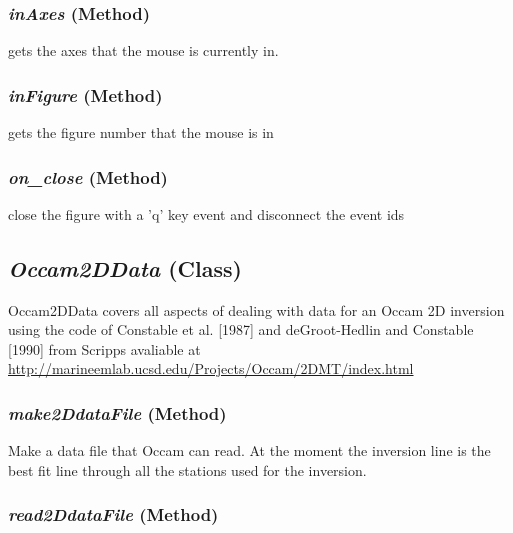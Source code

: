\subsubsection{\textit{inAxes} (Method)}
\label{sssec:.modeling.occamtools.OccamPointPicker.inAxes}

gets the axes that the mouse is currently in.

\subsubsection{\textit{inFigure} (Method)}
\label{sssec:.modeling.occamtools.OccamPointPicker.inFigure}

gets the figure number that the mouse is in

\subsubsection{\textit{on\_close} (Method)}
\label{sssec:.modeling.occamtools.OccamPointPicker.on_close}

close the figure with a 'q' key event and disconnect the event ids
        

\subsection{\textit{Occam2DData} (Class)}
\label{ssec:.modeling.occamtools.Occam2DData}

Occam2DData covers all aspects of dealing with data for an Occam 2D
    inversion using the code of Constable et al. [1987] and deGroot-Hedlin and 
    Constable [1990] from Scripps avaliable at \url{    http://marineemlab.ucsd.edu/Projects/Occam/2DMT/index.html}


\subsubsection{\textit{make2DdataFile} (Method)}
\label{sssec:.modeling.occamtools.Occam2DData.make2DdataFile}

Make a data file that Occam can read.  At the moment the inversion line
        is the best fit line through all the stations used for the inversion.

\subsubsection{\textit{read2DdataFile} (Method)}
\label{sssec:.modeling.occamtools.Occam2DData.read2DdataFile}

